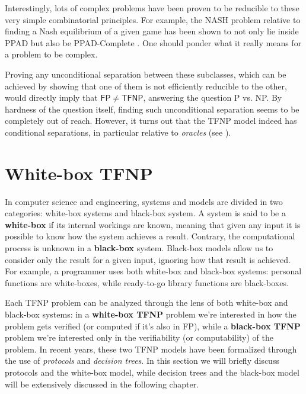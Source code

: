 Interestingly, lots of complex problems have been proven to be reducible to these very simple combinatorial principles. For example, the $\mathrm{NASH}$ problem relative to finding a Nash equilibrium of a given game has been shown to not only lie inside \textsf{PPAD} but also be \textsf{PPAD}-Complete \cite{nash_1, nash_2}. One should ponder what it really means for a problem to be complex.

Proving any unconditional separation between these subclasses, which can be achieved by showing that one of them is not efficiently reducible to the other, would directly imply that $\mathsf{FP} \neq \mathsf{TFNP}$, answering the question \textsf{P} vs. \textsf{NP}. By hardness of the question itself, finding such unconditional separation seems to be completely out of reach. However, it turns out that the \textsf{TFNP} model indeed has conditional separations, in particular relative to \textit{oracles} (see ).
 
\newpage

\section{White-box \textsf{TFNP}}

In computer science and engineering, systems and models are divided in two categories: white-box systems and black-box system. A system is said to be a \textbf{white-box} if  its internal workings are known, meaning that given any input it is possible to know how the system achieves a result. Contrary, the computational process is unknown in a \textbf{black-box} system. Black-box models allow us to consider only the result for a given input, ignoring how that result is achieved. For example, a programmer uses both white-box and black-box systems: personal functions are white-boxes, while ready-to-go library functions are black-boxes.

Each \textsf{TFNP} problem can be analyzed through the lens of both white-box and black-box systems: in a \textbf{white-box \textsf{TFNP}} problem we're interested in how the problem gets verified (or computed if it's also in \textsf{FP}), while a \textbf{black-box \textsf{TFNP}} problem we're interested only in the verifiability (or computability) of the problem. In recent years, these two \textsf{TFNP} models have been formalized through the use of \textit{protocols} and \textit{decision trees}. In this section we will briefly discuss protocols and the white-box model, while decision trees and the black-box model will be extensively discussed in the following chapter. 

